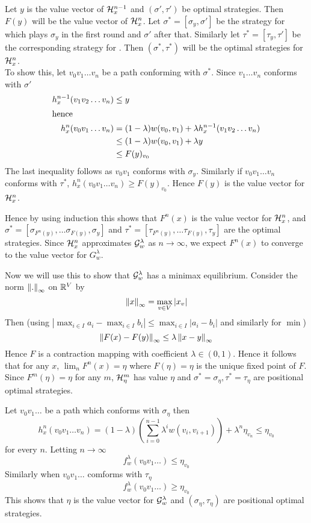 \begin{description}
Let $y$ is the value vector of $\mathcal{H}_x^{n-1}$ and $(\sigma',\tau')$ be optimal strategies. Then $F(y)$ will be the value vector of $\mathcal{H}_x^n$. Let $\sigma^*=[\sigma_y,\sigma']$ be the strategy for  which plays $\sigma_y$ in the first round and $\sigma'$ after that. Similarly let $\tau^*=[\tau_y,\tau']$ be the corresponding strategy for . Then $(\sigma^*,\tau^*)$ will be the optimal strategies for $\mathcal{H}^n_x$.\\
To show this, let $v_0 v_1 \ldots v_n$ be a path conforming with $\sigma^*$. Since $v_1 \ldots v_n$ conforms with $\sigma'$
\begin{align*}
    h^{n-1}_x(v_1 v_2 \ldots v_n) &\leq y\\
    \intertext{hence}
    h^n_x(v_0 v_1 \ldots v_n) &= (1-\lambda) w(v_0,v_1) + \lambda h^{n-1}_x(v_1v_2 \ldots v_n)\\
    &\leq (1-\lambda) w(v_0,v_1) + \lambda y \\
    &\leq F(y)_{v_0}
\end{align*}
The last inequality follows as $v_0v_1$ conforms with $\sigma_y$. Similarly if $v_0 v_1\ldots v_n$ conforms with $\tau^*$, $h^n_x(v_0v_1 \ldots v_n) \geq F(y)_{v_0}$. Hence $F(y)$ is the value vector for $\mathcal{H}^n_x$.
\end{description}

Hence by using induction this shows that $F^n(x)$ is the value vector for $\mathcal{H}^n_x$, and $\sigma^*=[\sigma_{F^n(y)},\ldots \sigma_{F(y)},\sigma_y]$ and $\tau^*=[\tau_{F^n(y)},\ldots \tau_{F(y)},\tau_y]$ are the optimal strategies. Since $\mathcal{H}^n_x$ approximates $\mathcal{G}^\lambda_w$ as $n \to \infty$, we expect $F^n(x)$ to converge to the value vector for $G^\lambda_w$.

Now we will use this to show that $\mathcal{G}^\lambda_w$ has a minimax equilibrium. Consider the norm $\left\lVert.\right\rVert_\infty$ on $\mathbb{R}^V$ by
\[
    \left\lVert x\right\rVert_\infty = \max_{v \in V} |x_v|
\]
Then (using $|\max_{i\in I} a_i - \max_{i \in I} b_i| \leq \max_{i \in I} |a_i-b_i|$ and similarly for $\min$)
\[
    \left\lVert F(x)-F(y)\right\rVert_\infty \leq \lambda \left\lVert x-y\right\rVert_\infty
\]
Hence $F$ is a contraction mapping with coefficient $\lambda \in (0,1)$. Hence it follows that for any $x$, $\lim_n F^n(x) = \eta$ where $F(\eta)=\eta$ is the unique fixed point of $F$. Since $F^m(\eta)=\eta$ for any $m$, $\mathcal{H}^m_\eta$ has value $\eta$ and $\sigma^*=\sigma_\eta, \tau^*=\tau_\eta$ are positional optimal strategies.

Let $v_0v_1 \ldots$ be a path which conforms with $\sigma_\eta$ then
\[
    h^n_x(v_0 v_1 \ldots v_n) = (1-\lambda) \left( \sum_{i=0}^{n-1} \lambda^i w(v_i,v_{i+1}) \right) + \lambda^n \eta_{v_n} \leq \eta_{v_0}
\]
for every $n$. Letting $n \to \infty$
\[
    f^\lambda_w(v_0 v_1 \ldots) \leq \eta_{v_0}
\]
Similarly when $v_0 v_1 \ldots$ comforms with $\tau_\eta$
\[
    f^\lambda_w(v_0 v_1 \ldots) \geq \eta_{v_0}
\]
This shows that $\eta$ is the value vector for $\mathcal{G}^\lambda_w$ and $(\sigma_\eta,\tau_\eta)$ are positional optimal strategies.

